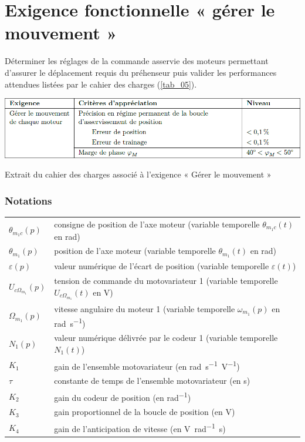 \documentclass[10pt,fleqn]{article} %
\begin{document}
\section{Exigence fonctionnelle « gérer le mouvement »}

\begin{obj}
Déterminer les réglages de la commande asservie des moteurs permettant d’assurer le déplacement requis
du préhenseur puis valider les performances attendues listées par le cahier des charges  (\autoref{tab_05}).
\end{obj}

\ifprof
\else

\begin{table}[H]
\centering
\includegraphics[width=0.9\linewidth]{tab_05}
\caption{Extrait du cahier des charges associé à l’exigence « Gérer le mouvement » \label{tab_05}}
\end{table}


\subsubsection*{Notations}

\begin{tabular}{ll}
$\theta_{m_1c}(p)$	& consigne de position de l’axe moteur (variable temporelle $\theta_{m_1c}(t)$ en \si{rad}) \\
$\theta_{m_1}(p)$ 	& position de l’axe moteur (variable temporelle $\theta_{m_1}(t)$ en \si{rad}) \\
$\varepsilon(p)$ 		& valeur numérique de l’écart de position (variable temporelle $\varepsilon(t)$) \\
$U_{c\Omega_{m_1}}(p)$& tension de commande du motovariateur 1 (variable temporelle $U_{c\Omega_{m_1}}(t)$ en \si{V}) \\
$\Omega_{m_1}(p)$ 	& vitesse angulaire du moteur 1 (variable temporelle $\omega_{m_1}(p)$ en \si{rad.s^{-1}}) \\
$N_1(p)$		& valeur numérique délivrée par le codeur 1 (variable temporelle $N_1(t)$) \\
$K_1$			& gain de l’ensemble motovariateur (en \si{rad.s^{-1}.V^{-1}}) \\
$\tau$			& constante de temps de l’ensemble motovariateur (en \si{s}) \\
$K_2$ 			& gain du codeur de position (en \si{rad^{-1}}) \\
$K_3$ 			& gain proportionnel de la boucle de position (en \si{V}) \\
$K_4$ 			& gain de l’anticipation de vitesse (en \si{V.rad^{-1}.s}) \\
\end{tabular}
\end{document}
